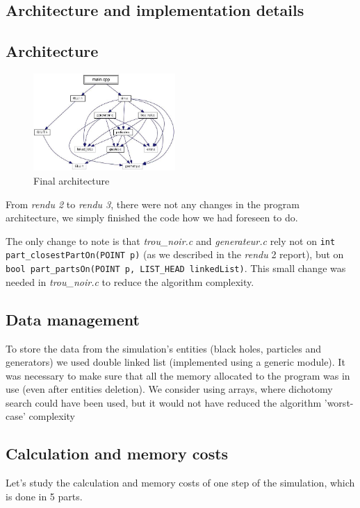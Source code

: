 \documentclass[a4paper]{article} %
\begin{document}
\begin{multicols*}{2}
\section{Architecture and implementation details}

\subsection{Architecture}
\begin{figure}[H]
\centering
\includegraphics[width=0.48\textwidth]{architecture.jpg}
\caption{Final architecture}
\end{figure}

From \emph{rendu 2} to \emph{rendu 3}, there were not any changes in the
program architecture, we simply finished the code how we had foreseen to do.

The only change to note is that \emph{trou\_noir.c} and \emph{generateur.c} rely not on \texttt{int part\_closestPartOn(POINT p)}
(as we described in the \emph{rendu }2 report), but on \texttt{bool part\_partsOn(POINT p, LIST\_HEAD linkedList)}.
This small change was needed in \emph{trou\_noir.c} to reduce the algorithm complexity.

\subsection{Data management}
To store the data from the simulation's entities (black holes, particles and generators)
we used double linked list (implemented using a generic module).
It was necessary to make sure that all the memory allocated to the program was in use (even after entities deletion).
We consider using arrays, where dichotomy search could have been used, but it would not have reduced the algorithm 'worst-case' complexity 

\subsection{Calculation and memory costs}
Let's study the calculation and memory costs of one step of the simulation,
which is done in 5 parts.


\end{multicols*}
\end{document}
